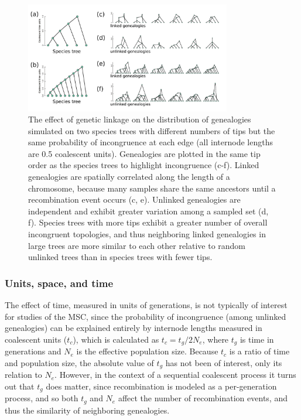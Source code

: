 \documentclass[11pt]{article}
\begin{document}
\begin{figure}
	\centering
		\includegraphics[width=0.8\textwidth]{./figures/Fig-1}
		\caption{
			The effect of genetic linkage on the distribution of genealogies simulated on two species trees with different numbers of tips but the same probability of incongruence at each edge (all internode lengths are 0.5 coalescent units). 	%
			Genealogies are plotted in the same tip order as the species trees to highlight incongruence (c-f). Linked genealogies are spatially correlated along the length of a chromosome, because many samples share the same ancestors until a recombination event occurs (c, e). Unlinked genealogies are independent and exhibit greater variation among a sampled set (d, f). Species trees with more tips exhibit a greater number of overall incongruent topologies, and thus neighboring linked genealogies in large trees are more similar to each other relative to random unlinked trees than in species trees with fewer tips.
		}
		\label{fig:1}
\end{figure}


\subsubsection{Units, space, and time}
The effect of time, measured in units of generations, is not typically of interest for studies of the MSC, since the probability of incongruence (among unlinked genealogies) can be explained entirely by internode lengths measured in coalescent units ($t_c$), which is calculated as $t_{c} = t_{g} / 2N_{e}$, where $t_g$ is time in generations and $N_e$ is the effective population size. Because $t_c$ is a ratio of time and population size, the absolute value of $t_{g}$ has not been of interest, only its relation to $N_{e}$. However, in the context of a sequential coalescent process it turns out that $t_{g}$ does matter, since recombination is modeled as a per-generation process, and so both $t_g$ and $N_e$ affect the number of recombination events, and thus the similarity of neighboring genealogies.
\end{document}
